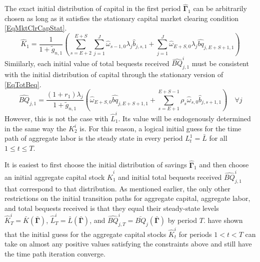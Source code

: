 \documentclass[letterpaper,12pt]{article}
\theoremstyle{definition}
\begin{document}
  The exact initial distribution of capital in the first period $\bm{\hat{\Gamma}}_1$ can be arbitrarily chosen as long as it satisfies the stationary capital market clearing condition \eqref{EqMktClrCapStat}.
  \begin{equation}\label{EqMktClrCapStat1}
    \hat{K}_1 = \frac{1}{1 + \tilde{g}_{n,1}}\left(\sum_{s=E+2}^{E+S}\sum_{j=1}^{J}\hat{\omega}_{s-1,0}\lambda_j \hat{b}_{j,s,1} + \sum_{j=1}^{J}\hat{\omega}_{E+S,0}\lambda_j \hat{bq}_{j,E+S+1,1}\right)
  \end{equation}
  Simiilarly, each initial value of total bequests received $\hat{BQ}_{j,1}^i$ must be consistent with the initial distribution of capital through the stationary version of \eqref{EqTotBeq}.
  \begin{equation}\label{EqTotBeqStat1}
    \hat{BQ}_{j,1} = \frac{(1+r_1)\lambda_j}{1+\tilde{g}_{n,1}}\left(\hat{\omega}_{E+S,0}\hat{bq}_{j,E+S+1,1} + \sum_{s=E+1}^{E+S-1}\rho_s\hat{\omega}_{s,0}\hat{b}_{j,s+1,1}\right) \quad\forall j
  \end{equation}
  However, this is not the case with $\hat{L}_1^i$. Its value will be endogenously determined in the same way the $K_2^i$ is. For this reason, a logical initial guess for the time path of aggregate labor is the steady state in every period $L_t^1 = \bar{L}$ for all $1\leq t\leq T$.

  It is easiest to first choose the initial distribution of savings $\bm{\hat{\Gamma}}_1$ and then choose an initial aggregate capital stock $\hat{K}_1^i$ and initial total bequests received $\hat{BQ}_{j,1}^i$ that correspond to that distribution. As mentioned earlier, the only other restrictions on the initial transition paths for aggregate capital, aggregate labor, and total bequests received is that they equal their steady-state levels $\hat{K}_T^i = \bar{K}\left(\bm{\bar{\Gamma}}\right)$, $\hat{L}_T^i = \bar{L}\left(\bm{\bar{\Gamma}}\right)$, and $\hat{BQ}_{j,T}^i = \bar{BQ}_j\left(\bm{\bar{\Gamma}}\right)$ by period $T$. \citet{EvansPhillips:2014} have shown that the initial guess for the aggregate capital stocks $\hat{K}_t^i$ for periods $1<t<T$ can take on almost any positive values satisfying the constraints above and still have the time path iteration converge.
\end{document}

